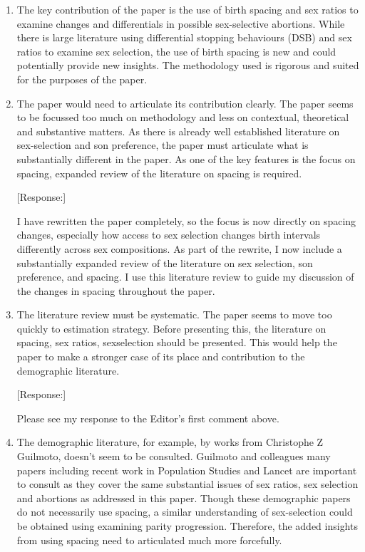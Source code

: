 \documentclass[letterpaper,12pt]{article}
\begin{document}
\begin{enumerate}
\item The key contribution of the paper is the use of birth spacing and sex
ratios to examine changes and differentials in possible sex-selective
abortions. While there is large literature using differential stopping
behaviours (DSB) and sex ratios to examine sex selection, the use of
birth spacing is new and could potentially provide new insights. The
methodology used is rigorous and suited for the purposes of the paper.


\item The paper would need to articulate its contribution clearly. The
paper seems to be focussed too much on methodology and less on
contextual, theoretical and substantive matters. As there is already
well established literature on sex-selection and son preference, the
paper must articulate what is substantially different in the paper. As
one of the key features is the focus on spacing, expanded review of the
literature on spacing is required.

[Response:]

I have rewritten the paper completely, so the focus is now directly on spacing 
changes, especially how access to sex selection changes birth intervals differently across 
sex compositions.
As part of the rewrite, I now include a substantially expanded review of the literature
on sex selection, son preference, and spacing.
I use this literature review to guide my discussion of the changes in spacing throughout
the paper.


\item The literature review must be systematic. The paper seems to move too
quickly to estimation strategy. Before presenting this, the literature
on spacing, sex ratios, sexselection should be presented. This would
help the paper to make a stronger case of its place and contribution to
the demographic literature.

[Response:]

Please see my response to the Editor's first comment above.


\item The demographic literature, for example, by works from Christophe Z
Guilmoto, doesn’t seem to be consulted. Guilmoto and colleagues many
papers including recent work in Population Studies and Lancet are
important to consult as they cover the same substantial issues of sex
ratios, sex selection and abortions as addressed in this paper. Though
these demographic papers do not necessarily use spacing, a similar
understanding of sex-selection could be obtained using examining parity
progression. Therefore, the added insights from using spacing need to
articulated much more forcefully.


\end{enumerate}
\end{document}

